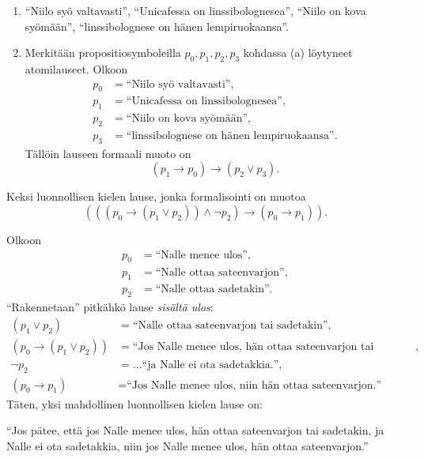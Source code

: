 \documentclass[11pt,a4paper]{amsart}
\begin{document}
\begin{solution}
\leavevmode\par
\begin{enumerate}[label=\alph*), nosep]
\item ``Niilo syö valtavasti'', ``Unicafessa on linssibolognesea'',
``Niilo on kova syömään'', ``linssibolognese on hänen lempiruokaansa''.

\item Merkitään propositiosymboleilla \(p_0,p_1,p_2,p_3\) kohdassa (a)
löytyneet atomilauseet. Olkoon
\[
\begin{aligned}
  p_0 &= \text{``Niilo syö valtavasti''},\\
  p_1 &= \text{``Unicafessa on linssibolognesea''},\\
  p_2 &= \text{``Niilo on kova syömään''},\\
  p_3 &= \text{``linssibolognese on hänen lempiruokaansa''}.
\end{aligned}
\]
Tällöin lauseen formaali muoto on
\[
(p_1 \to p_0) \to (p_2 \lor p_3).
\]
\end{enumerate}
\end{solution}

\begin{exercise}
Keksi luonnollisen kielen lause, jonka formalisointi on muotoa
\[(((p_0 \rightarrow (p_1 \lor p_2)) \land \neg p_2) \rightarrow (p_0
\rightarrow p_1)).\]
\end{exercise}

\begin{solution}
Olkoon
\[
\begin{aligned}
p_0 &= \text{``Nalle menee ulos''}, \\
p_1 &= \text{``Nalle ottaa sateenvarjon''}, \\
p_2 &= \text{``Nalle ottaa sadetakin''}.
\end{aligned}
\]
``Rakennetaan'' pitkähkö lause \emph{sisältä ulos}:
\[
\begin{aligned}
(p_1 \lor p_2) &= \text{``Nalle ottaa sateenvarjon tai sadetakin''}, \\
(p_0 \rightarrow (p_1 \lor p_2)) &= \text{``Jos Nalle menee ulos, hän
ottaa sateenvarjon tai sadetakin''}, \\
\neg p_2 &= \dots \text{``ja Nalle ei ota sadetakkia.''}, \\
(p_0 \rightarrow p_1) &= \text{``Jos Nalle menee ulos, niin hän ottaa
sateenvarjon.''}
\end{aligned}
\]
Täten, yksi mahdollinen luonnollisen kielen lause on:

``Jos pätee, että jos Nalle menee ulos, hän ottaa sateenvarjon tai
sadetakin, ja Nalle ei ota sadetakkia, niin jos Nalle menee ulos,
hän ottaa sateenvarjon.''
\end{solution}
\end{document}
